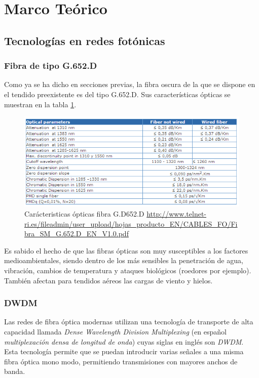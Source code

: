 
\section{Marco Te\'orico}
\label{sec:marcoteorico}

\subsection{Tecnolog\'ias en redes fot\'onicas}
\label{sec:redfotonica}

\subsubsection{Fibra de tipo G.652.D}

Como ya se ha dicho en secciones previas, la fibra oscura de la que se
dispone en el tendido preexistente es del tipo G.652.D. Sus
características ópticas se muestran en la tabla \ref{fig:tablafibra}.

\begin{figure}[H]
  \centering
  \includegraphics[scale=1]{Imagenes/Fibra.png}
  \caption{Carácteristicas ópticas fibra G.D652.D
    \url{http://www.telnet-ri.es/fileadmin/user_upload/hojas_producto_EN/CABLES_FO/Fibra_SM_G.652.D_EN_V1.0.pdf}}
  \label{fig:tablafibra}
\end{figure}
  
Es sabido el hecho de que las fibras ópticas son muy susceptibles a
los factores medioambientales, siendo dentro de los más sensibles la
penetración de agua, vibración, cambios de temperatura y ataques
biológicos (roedores por ejemplo). También afectan para tendidos
aéreos las cargas de viento y hielos.

\subsubsection{DWDM}
\label{sec:dwdm}

Las redes de fibra óptica modernas utilizan una tecnología de
transporte de alta capacidad llamada \emph{Dense Wavelength Division
  Multiplexing} (en español \emph{multiplexación densa de longitud de
  onda}) cuyas siglas en inglés son \emph{DWDM}. Esta tecnología
permite que se puedan introducir varias señales a una misma fibra
óptica mono modo, permitiendo transmisiones con mayores anchos de
banda.

